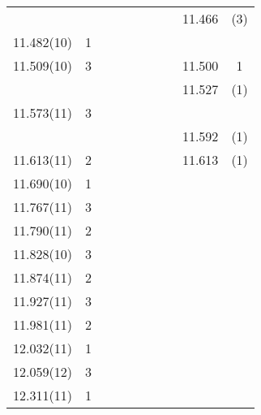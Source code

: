 \begin{landscape}
\begin{center}
\begin{longtable}{cc cc cc cc cc}
                &              &          &         &            &                &       &          & 11.466   & (3)  \\
    11.482(10)  & 1            &          &         &            &                &       &          &          &      \\
    11.509(10)  & 3            &          &         &            &                &       &          & 11.500   & 1    \\
                &              &          &         &            &                &       &          & 11.527   & (1)  \\
     11.573(11) & 3            &          &         &            &                &       &          &          &      \\
                &              &          &         &            &                &       &          & 11.592   & (1)  \\
     11.613(11) & 2            &          &         &            &                &       &          & 11.613   & (1)  \\
   11.690(10)   & 1            &          &         &            &                &       &          &          &      \\
   11.767(11)   & 3            &          &         &            &                &       &          &          &      \\
   11.790(11)   & 2            &          &         &            &                &       &          &          &      \\
   11.828(10)   & 3            &          &         &            &                &       &          &          &      \\
     11.874(11) & 2            &          &         &            &                &       &          &          &      \\
    11.927(11)  & 3            &          &         &            &                &       &          &          &      \\
    11.981(11)  & 2            &          &         &            &                &       &          &          &      \\
     12.032(11) & 1            &          &         &            &                &       &          &          &      \\
     12.059(12) & 3            &          &         &            &                &       &          &          &      \\
    12.311(11)  & 1            &          &         &            &                &       &          &          &      \\




    \end{longtable}
\end{center}
\end{landscape}
